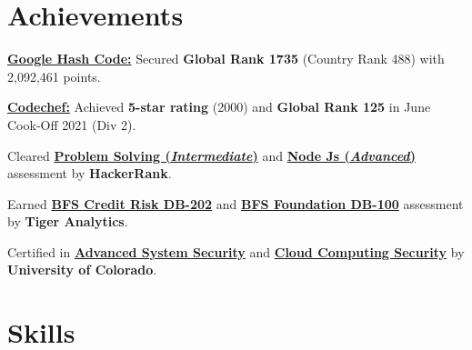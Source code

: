 \documentclass[]{resume-openfont}
\begin{document}
\section{Achievements}
\begin{bullets}
    \item \textbf{\href{https://drive.google.com/file/d/1PHLWF7olshOeVYCrIPq_-AS-QvxKBV9m/view?usp=sharing}{Google Hash Code:}} Secured \textbf{Global Rank 1735} (Country Rank 488) with 2,092,461 points.
    \item \textbf{\href{https://www.codechef.com/users/mrsayan/}{Codechef:}} Achieved \textbf{5-star rating} (2000) and \textbf{Global Rank 125} in June Cook-Off 2021 (Div 2).  
    \item Cleared \textbf{\href{https://www.hackerrank.com/certificates/4099d9ae927f}{Problem Solving (\textit{Intermediate})}} and \textbf{\href{https://www.hackerrank.com/certificates/5ce743e1535f}{Node Js (\textit{Advanced})}} assessment by \textbf{HackerRank}.
    \item Earned \textbf{\href{https://portal.itscredible.com/qr/011935087616}{BFS Credit Risk DB-202}} and \textbf{\href{https://portal.itscredible.com/qr/364557169231}{BFS Foundation DB-100}} assessment by \textbf{Tiger Analytics}.
    \item Certified in \textbf{\href{https://www.coursera.org/account/accomplishments/records/WPEUHLLDD3BS}{Advanced System Security}} and \textbf{\href{https://www.coursera.org/account/accomplishments/records/6WN5KEGURZS9}{Cloud Computing Security}} by \textbf{University of Colorado}.
\end{bullets}
\sectionsep

\section{Skills}
\end{document}
